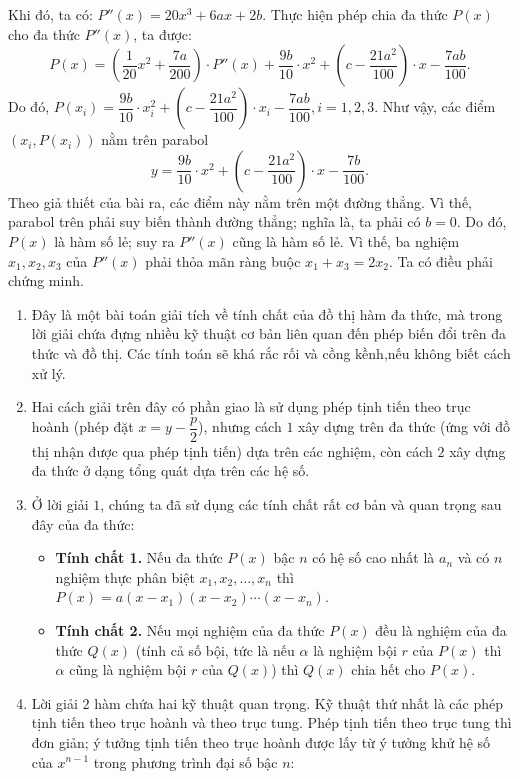 \begin{bt}
{		Khi đó, ta có: $P''(x)=20x^3+6ax+2b$.
Thực hiện phép chia đa thức $P(x)$ cho đa thức $P''(x)$, ta được: 
$$ P(x)=\left(\dfrac{1}{20}x^2+\dfrac{7a}{200}\right)\cdot P''(x)+\dfrac{9b}{10}\cdot x^2+\left(c-\dfrac{21a^2}{100}\right)\cdot x-\dfrac{7ab}{100}.$$
Do đó, $P\left(x_i\right)=\dfrac{9b}{10}\cdot x_i^2+\left(c-\dfrac{21a^2}{100}\right)\cdot x_i-\dfrac{7ab}{100}, i=1, 2, 3$.
Như vậy, các điểm $\left(x_i, P\left(x_i\right)\right)$ nằm trên parabol $$y=\dfrac{9b}{10}\cdot x^2+\left(c-\dfrac{21a^2}{100}\right)\cdot x-\dfrac{7b}{100}.$$
Theo giả thiết của bài ra, các điểm này nằm trên một đường thẳng. Vì thế, parabol trên phải suy biến thành đường thẳng; nghĩa là, ta phải có $b=0$.
Do đó, $P(x)$ là hàm số lẻ; suy ra $P''(x)$ cũng là hàm số lẻ. Vì thế, ba nghiệm $x_1, x_2, x_3$ của $P''(x)$ phải thỏa mãn ràng buộc $x_1+x_3=2x_2$. Ta có điều phải chứng minh.
\begin{nx}\hfill
\begin{enumerate}
			\item Đây là một bài toán giải tích về tính chất của đồ thị hàm đa thức, mà trong lời giải chứa đựng nhiều kỹ thuật cơ bản liên quan đến phép biến đổi trên đa thức và đồ thị. Các tính toán sẽ khá rắc rối và cồng kềnh,nếu không biết cách xử lý.
			\item Hai cách giải trên đây có phần giao là sử dụng phép tịnh tiến theo trục hoành (phép đặt $x = y-\dfrac{p}{2}$), nhưng cách $1$ xây dựng trên đa thức (ứng với đồ thị nhận được qua phép tịnh tiến) dựa trên các nghiệm, còn cách $2$ xây dựng đa thức ở dạng tổng quát dựa trên các hệ số.
			\item Ở lời giải $1$, chúng ta đã sử dụng các tính chất rất cơ bản và quan trọng sau đây của đa thức:
			\begin{itemize}
				\item \textbf{Tính chất 1.} Nếu đa thức $P(x)$ bậc $n$ có hệ số cao nhất là $a_n$ và có $n$ nghiệm thực phân biệt $x_1, x_2,\ldots, x_n$ thì $P(x)=a\left(x-x_1\right)\left(x-x_2\right)\cdots\left(x-x_n\right)$.
				\item \textbf{Tính chất 2.} Nếu mọi nghiệm của đa thức $P(x)$ đều là nghiệm của đa thức $Q(x)$ (tính cả số bội, tức là nếu $\alpha$ là nghiệm bội $r$ của $P(x)$ thì $\alpha$ cũng là nghiệm bội $r$ của $Q(x)$) thì $Q(x)$ chia hết cho $P(x)$.
			\end{itemize}
			\item Lời giải $2$ hàm chứa hai kỹ thuật quan trọng. Kỹ thuật thứ nhất là các phép tịnh tiến theo trục hoành và theo trục tung. Phép tịnh tiến theo trục tung thì đơn giản; ý tưởng tịnh tiến theo trục hoành được lấy từ ý tưởng khử hệ số của $x^{n-1}$ trong phương trình đại số bậc $n$:

\end{enumerate}
\end{nx}}
\end{bt}
